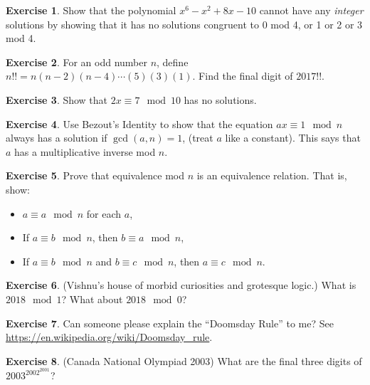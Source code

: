 \documentclass[11pt]{article}
\theoremstyle{definition}
\newtheorem{exercise}{Exercise}
\numberwithin{thm}{section}
\begin{document}
\begin{exercise} Show that the polynomial $x^6 - x^2 + 8x - 10$ cannot have any \textit{integer} solutions by showing that it has no solutions congruent to $0$ mod 4, or 1 or 2 or 3 mod 4.
\end{exercise}

\begin{exercise} For an odd number $n$, define $n!! = n(n-2)(n-4)\cdots(5)(3)(1)$. Find the final digit of $2017!!$.
\end{exercise}

\begin{exercise} Show that $2x \equiv 7 \mod 10$ has no solutions.
\end{exercise}

\begin{exercise} Use Bezout's Identity to show that the equation $ax \equiv 1 \mod n$ always has a solution if $\gcd(a,n) = 1$, (treat $a$ like a constant). This says that $a$ has a multiplicative inverse mod $n$.
\end{exercise}

\begin{exercise} Prove that equivalence mod $n$ is an equivalence relation. That is, show:
\begin{itemize}
	\item $a \equiv a \mod n$ for each $a$,
    \item If $a \equiv b \mod n$, then $b \equiv a \mod n$,
    \item If $a \equiv b \mod n$ and $b \equiv c \mod n$, then $a \equiv c \mod n$.
\end{itemize}
\end{exercise}

\begin{exercise} (Vishnu's house of morbid curiosities and grotesque logic.) What is $2018 \mod 1$? What about $2018 \mod 0$?
\end{exercise}

\begin{exercise} Can someone please explain the ``Doomsday Rule'' to me? See \url{https://en.wikipedia.org/wiki/Doomsday_rule}.
\end{exercise}

\begin{exercise} (Canada National Olympiad 2003) What are the final three digits of $2003^{2002^{2001}}$?
\end{exercise}
\end{document}
